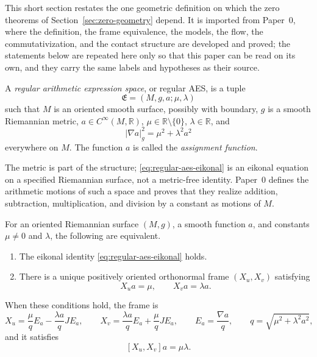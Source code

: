 This short section restates the one geometric definition on which the zero
theorems of Section~\ref{sec:zero-geometry} depend.  It is imported from Paper~0,
where the definition, the frame equivalence, the models, the flow, the
commutativization, and the contact structure are developed and proved; the
statements below are repeated here only so that this paper can be read on its
own, and they carry the same labels and hypotheses as their source.

\begin{definition}
\label{def:regular-aes}
A \emph{regular arithmetic expression space}, or regular AES, is a tuple
\[
 \mathfrak E=(M,g,a;\mu,\lambda)
\]
such that $M$ is an oriented smooth surface, possibly with boundary, $g$ is a
smooth Riemannian metric, $a\in C^\infty(M,\mathbb R)$,
$\mu\in\mathbb R\setminus\{0\}$, $\lambda\in\mathbb R$, and
\begin{equation}\label{eq:regular-aes-eikonal}
 |\nabla a|_g^2=\mu^2+\lambda^2a^2
\end{equation}
everywhere on $M$.  The function $a$ is called the \emph{assignment function}.
\end{definition}

The metric is part of the structure; \eqref{eq:regular-aes-eikonal} is an
eikonal equation on a specified Riemannian surface, not a metric-free identity.
Paper~0 defines the arithmetic motions of such a space and proves that they
realize addition, subtraction, multiplication, and division by a constant as
motions of $M$.

\begin{proposition}
\label{prop:canonical-arithmetic-frame}
For an oriented Riemannian surface $(M,g)$, a smooth function $a$, and constants
$\mu\ne0$ and $\lambda$, the following are equivalent.
\begin{enumerate}
\item The eikonal identity \eqref{eq:regular-aes-eikonal} holds.
\item There is a unique positively oriented orthonormal frame $(X_u,X_v)$
      satisfying
      \begin{equation}\label{eq:arithmetic-frame-derivatives}
       X_u a=\mu,
       \qquad
       X_v a=\lambda a.
      \end{equation}
\end{enumerate}
When these conditions hold, the frame is
\begin{equation}\label{eq:explicit-arithmetic-frame}
 X_u=\frac{\mu}{q}E_a-\frac{\lambda a}{q}JE_a,
 \qquad
 X_v=\frac{\lambda a}{q}E_a+\frac{\mu}{q}JE_a,
 \qquad
 E_a=\frac{\nabla a}{q},
 \qquad
 q=\sqrt{\mu^2+\lambda^2a^2},
\end{equation}
and it satisfies
\begin{equation}\label{eq:arithmetic-frame-bracket-on-a}
 [X_u,X_v]a=\mu\lambda .
\end{equation}
\end{proposition}

